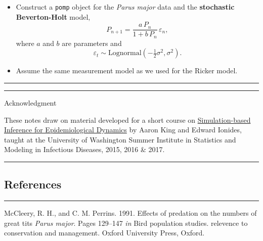 \documentclass[]{article}
\begin{document}
\begin{itemize}
\item
  Construct a \texttt{pomp} object for the \emph{Parus major} data and
  the \textbf{stochastic Beverton-Holt} model,
  \[P_{n+1} = \frac{a\,P_n}{1+b\,P_n}\,\varepsilon_n,\] where \(a\) and
  \(b\) are parameters and
  \[\varepsilon_t \sim \mathrm{Lognormal}(-\tfrac{1}{2}\sigma^2,\sigma^2).\]
\item
  Assume the same measurement model as we used for the Ricker model.
\end{itemize}

\begin{center}\rule{0.5\linewidth}{\linethickness}\end{center}

\begin{center}\rule{0.5\linewidth}{\linethickness}\end{center}

Acknowledgment

These notes draw on material developed for a short course on
\href{http://kingaa.github.io/sbied/}{Simulation-based Inference for
Epidemiological Dynamics} by Aaron King and Edward Ionides, taught at
the University of Washington Summer Institute in Statistics and Modeling
in Infectious Diseases, 2015, 2016 \& 2017.

\begin{center}\rule{0.5\linewidth}{\linethickness}\end{center}

\subsection{References}\label{references}

\begin{center}\rule{0.5\linewidth}{\linethickness}\end{center}

\hypertarget{refs}{}
\hypertarget{ref-mccleery91}{}
McCleery, R. H., and C. M. Perrins. 1991. Effects of predation on the
numbers of great tits \emph{Parus major}. Pages 129--147 \emph{in} Bird
population studies. relevence to conservation and management. Oxford
University Press, Oxford.
\end{document}

